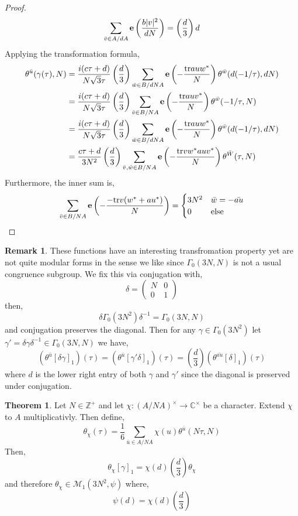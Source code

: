\documentclass{article}
\newcommand{\C}{\mathbb{C}}
\newcommand{\Zplus}{\mathbb{Z}^{+}}
\theoremstyle{definition}
\newtheorem{theorem}{Theorem}[section]
\newtheorem{remark}{Remark}[section]
\newcommand{\M}[1]{\mathcal{M}_{#1}}
\begin{document}
\begin{proof}
\[ \sum_{\bar{v} \in A / d A} \mathbf{e}\left( \frac{b |v|^2}{dN} \right) = \left( \frac{d}{3} \right) d \]
Applying the transformation formula,
\begin{align*}
\theta^{\bar{u}}(\gamma(\tau), N) & = \frac{i (c \tau + d)}{N \sqrt{3} \tau} \left( \frac{d}{3} \right) \sum_{\bar{w} \in B / d N A} \mathbf{e}\left( - \frac{\mathrm{tr}{a u w^*}}{N} \right) \theta^{\bar{w}}(d(-1/\tau), d N)
\\
& = \frac{i (c \tau + d)}{N \sqrt{3} \tau} \left( \frac{d}{3} \right) \sum_{\bar{v} \in B / N A} \mathbf{e}\left( - \frac{\mathrm{tr}{a u v^*}}{N} \right) \theta^{\bar{w}}(-1/\tau, N)
\\
& = \frac{i (c \tau + d)}{N \sqrt{3} \tau} \left( \frac{d}{3} \right) \sum_{\bar{w} \in B / d N A} \mathbf{e}\left( - \frac{\mathrm{tr}{a u w^*}}{N} \right) \theta^{\bar{w}}(d(-1/\tau), d N)
\\
& = \frac{c \tau + d}{3 N^2} \left( \frac{d}{3} \right) \sum_{\bar{v}, \bar{w} \in B / NA} \mathbf{e}\left( - \frac{\mathrm{tr}{v w^* a u v^*}}{N} \right) \theta^{\bar{W}}(\tau, N)
\end{align*}
Furthermore, the inner sum is,
\[ \sum_{\bar{v} \in B / NA} \mathbf{e}\left(  - \frac{-\mathrm{tr}{v(w^* + a u^*)}}{N} \right) = \begin{cases}
3 N^2 & \bar{w} = - \bar{a u}
\\
0 & \text{else}
\end{cases} \]
\end{proof}

\begin{remark}
These functions have an interesting transfromation property yet are not quite modular forms in the sense we like since $\Gamma_0(3N, N)$ is not a usual congruence subgroup. We fix this via conjugation with,
\[ \delta = 
\begin{pmatrix}
N & 0 
\\
0 & 1 
\end{pmatrix} \]
then,
\[ \delta \Gamma_0(3 N^2) \delta^{-1} = \Gamma_0(3N, N) \]
and conjugation preserves the diagonal. Then for any $\gamma \in \Gamma_0(3 N^2)$ let $\gamma' = \delta \gamma \delta^{-1} \in \Gamma_0(3N, N)$ we have,
\[ (\theta^{\bar{u}} [\delta \gamma]_1)(\tau) = (\theta^{\bar{u}}[\gamma' \delta]_1)(\tau) = \left( \frac{d}{3} \right) (\theta^{\bar{au}} [\delta]_1)(\tau) \]
where $d$ is the lower right entry of both $\gamma$ and $\gamma'$ since the diagonal is preserved under conjugation. 
\end{remark}

\begin{theorem}
Let $N \in \Zplus$ and let $\chi : (A / NA)^\times \to \C^\times$ be a character. Extend $\chi$ to $A$ multiplicativly. Then define,
\[ \theta_\chi(\tau) = \frac{1}{6} \sum_{\bar{u} \in A / NA} \chi(u) \theta^{\bar{u}}(N \tau, N) \]
Then,
\[ \theta_\chi[\gamma]_1 = \chi(d) \left( \frac{d}{3} \right) \theta_\chi \]
and therefore $\theta_\chi \in \M{1}(3N^2, \psi)$ where,
\[ \psi(d) = \chi(d) \left( \frac{d}{3} \right) \]
\end{theorem}
\end{document}
